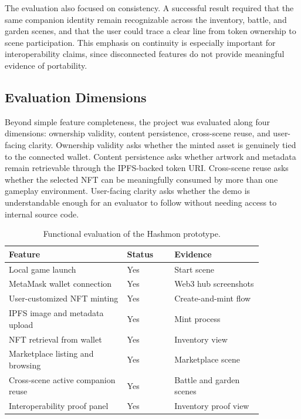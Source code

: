 \documentclass[sigconf]{acmart}
\begin{document}
The evaluation also focused on consistency. A successful result required that the same companion identity remain recognizable across the inventory, battle, and garden scenes, and that the user could trace a clear line from token ownership to scene participation. This emphasis on continuity is especially important for interoperability claims, since disconnected features do not provide meaningful evidence of portability.

\subsection{Evaluation Dimensions}
Beyond simple feature completeness, the project was evaluated along four dimensions: ownership validity, content persistence, cross-scene reuse, and user-facing clarity. Ownership validity asks whether the minted asset is genuinely tied to the connected wallet. Content persistence asks whether artwork and metadata remain retrievable through the IPFS-backed token URI. Cross-scene reuse asks whether the selected NFT can be meaningfully consumed by more than one gameplay environment. User-facing clarity asks whether the demo is understandable enough for an evaluator to follow without needing access to internal source code.

\begin{table}[t]
  \caption{Functional evaluation of the Hashmon prototype.}
  \label{tab:features}
  \centering
  \begin{tabular}{p{0.40\linewidth}p{0.16\linewidth}p{0.30\linewidth}}
    \toprule
    Feature & Status & Evidence \\
    \midrule
    Local game launch & Yes & Start scene \\
    MetaMask wallet connection & Yes & Web3 hub screenshots \\
    User-customized NFT minting & Yes & Create-and-mint flow \\
    IPFS image and metadata upload & Yes & Mint process \\
    NFT retrieval from wallet & Yes & Inventory view \\
    Marketplace listing and browsing & Yes & Marketplace scene \\
    Cross-scene active companion reuse & Yes & Battle and garden scenes \\
    Interoperability proof panel & Yes & Inventory proof view \\
    \bottomrule
  \end{tabular}
\end{table}
\end{document}
